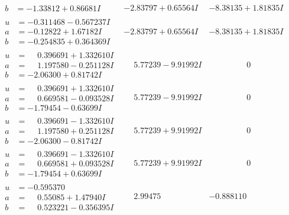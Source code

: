 \documentclass[1p]{elsarticle_modified}
\theoremstyle{definition}
\begin{document}
$$\begin{array}{c|c|c}
\begin{aligned}
b &= -1.33812 + 0.86681 I\end{aligned}
 & -2.83797 + 0.65564 I & -8.38135 + 1.81835 I \\ \hline\begin{aligned}
u &= -0.311468 - 0.567237 I \\
a &= -0.12822 + 1.67182 I \\
b &= -0.254835 + 0.364369 I\end{aligned}
 & -2.83797 + 0.65564 I & -8.38135 + 1.81835 I \\ \hline\begin{aligned}
u &= \phantom{-}0.396691 + 1.332610 I \\
a &= \phantom{-}1.197580 - 0.251128 I \\
b &= -2.06300 + 0.81742 I\end{aligned}
 & \phantom{-}5.77239 - 9.91992 I & \phantom{-0.000000 } 0 \\ \hline\begin{aligned}
u &= \phantom{-}0.396691 + 1.332610 I \\
a &= \phantom{-}0.669581 - 0.093528 I \\
b &= -1.79454 - 0.63699 I\end{aligned}
 & \phantom{-}5.77239 - 9.91992 I & \phantom{-0.000000 } 0 \\ \hline\begin{aligned}
u &= \phantom{-}0.396691 - 1.332610 I \\
a &= \phantom{-}1.197580 + 0.251128 I \\
b &= -2.06300 - 0.81742 I\end{aligned}
 & \phantom{-}5.77239 + 9.91992 I & \phantom{-0.000000 } 0 \\ \hline\begin{aligned}
u &= \phantom{-}0.396691 - 1.332610 I \\
a &= \phantom{-}0.669581 + 0.093528 I \\
b &= -1.79454 + 0.63699 I\end{aligned}
 & \phantom{-}5.77239 + 9.91992 I & \phantom{-0.000000 } 0 \\ \hline\begin{aligned}
u &= -0.595370\phantom{ +0.000000I} \\
a &= \phantom{-}0.55085 + 1.47940 I \\
b &= \phantom{-}0.523221 - 0.356395 I\end{aligned}
 & \phantom{-}2.99475\phantom{ +0.000000I} & -0.888110\phantom{ +0.000000I} \\ \hline\begin{aligned}

\end{aligned}
\end{array}$$
\end{document}

